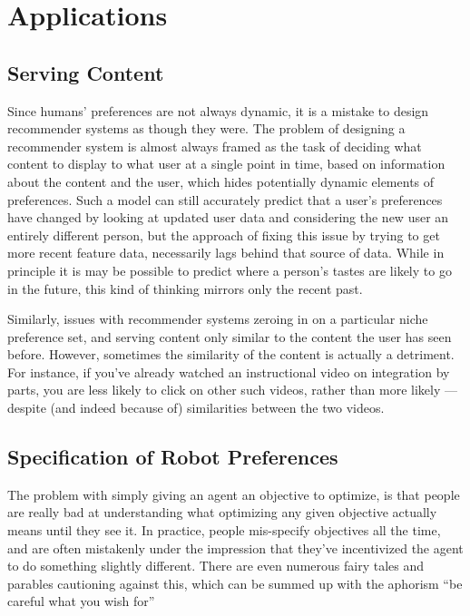 \documentclass{article}
\theoremstyle{plain}
\theoremstyle{definition}
\theoremstyle{remark}
\begin{document}
		\section{Applications}
	
	
	\subsection{Serving Content}
	Since humans' preferences are not always dynamic, it is a mistake to design recommender systems as though they were. The problem of designing a recommender system is almost always framed as the task of deciding what content to display to what user at a single point in time, based on information about the content and the user, which hides potentially dynamic elements of preferences. Such a model can still accurately predict that a user's preferences have changed by looking at updated user data and considering the new user an entirely different person, but the approach of fixing this issue by trying to get more recent feature data, necessarily lags behind that source of data. While in principle it is may be possible to predict where a person's tastes are likely to go in the future, this kind of thinking mirrors only the recent past.
	
	Similarly, issues with recommender systems zeroing in on a particular niche preference set, and serving content only similar to the content the user has seen before. However, sometimes the similarity of the content is actually a detriment. For instance, if you've already watched an instructional video on integration by parts, you are less likely to click on other such videos, rather than more likely --- despite (and indeed because of) similarities between the two videos.
	


	

	
	\subsection{Specification of Robot Preferences}
	The problem with simply giving an agent an objective to optimize, is that people are really bad at understanding what optimizing any given objective actually means until they see it. In practice, people mis-specify objectives all the time, and are often mistakenly under the impression that they've incentivized the agent to do something slightly different. There are even numerous fairy tales and parables cautioning against this, which can be summed up with the aphorism ``be careful what you wish for''
	
\end{document}
